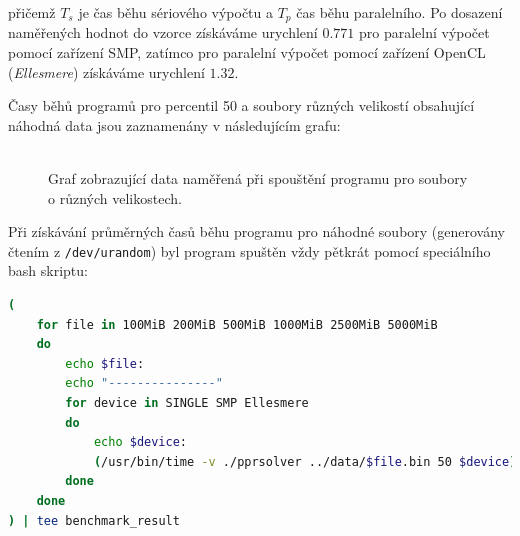 \documentclass[12pt, a4paper]{article}
\begin{document}
přičemž $T_s$ je čas běhu sériového výpočtu a $T_p$ čas běhu paralelního. 
Po dosazení naměřených hodnot do vzorce získáváme urychlení $0.771$ pro paralelní výpočet pomocí zařízení SMP, zatímco pro paralelní výpočet pomocí zařízení OpenCL (\textit{Ellesmere}) získáváme urychlení $1.32.$

Časy běhů programů pro percentil 50 a soubory různých velikostí obsahující náhodná data jsou zaznamenány v následujícím grafu:
\\
\\
\begin{figure}[!ht]
    \centering
    \caption{Graf zobrazující data naměřená při spouštění programu pro soubory o různých velikostech.}
\end{figure}

\newpage
Při získávání průměrných časů běhu programu pro náhodné soubory (generovány čtením z \texttt{/dev/urandom}) byl program spuštěn vždy pětkrát pomocí speciálního bash skriptu:

\begin{lstlisting}[language=bash,caption={Bash skript pro spuštění vytvořeného programu pro různé soubory a pro všechna dostupná zařízení.},captionpos=b, label={lst:benchmark-script}]
(
    for file in 100MiB 200MiB 500MiB 1000MiB 2500MiB 5000MiB
    do
        echo $file:
        echo "---------------"
        for device in SINGLE SMP Ellesmere
        do 
            echo $device:
            (/usr/bin/time -v ./pprsolver ../data/$file.bin 50 $device) 2>&1 | grep -E "Maximum resident set size|Elapsed|e) page faults"
        done 
    done
) | tee benchmark_result
\end{lstlisting}
\end{document}
